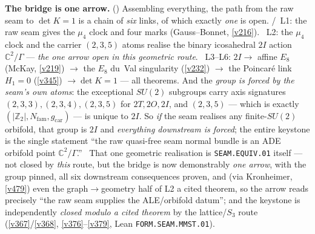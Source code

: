 \documentclass[11pt,a4paper]{article}
\newcommand{\gcar}{g_{\mathrm{car}}}
\newcommand{\Nfam}{N_{\mathrm{fam}}}
\newcommand{\Z}{\mathbb Z}
\begin{document}
\par\smallskip\noindent\textbf{The bridge is one arrow.} ()
Assembling everything, the path from the raw seam to $\det K{=}1$ is a chain of \emph{six} links, of which exactly
\emph{one} is open. \mE/\mC\ L1: the raw seam gives the $\mu_4$ clock and four marks (Gauss--Bonnet, \vref{v216}).
\mO\ L2: the $\mu_4$ clock and the carrier $(2,3,5)$ atoms realise the binary icosahedral $2I$ action
$\mathbb{C}^2/\Gamma$ --- \emph{the one arrow open in this geometric route}. \mE\ L3--L6: $2I\to$ affine $E_8$ (McKay, \vref{v219}) $\to$ the $E_8$ du~Val
singularity (\vref{v232}) $\to$ the Poincar\'e link $H_1{=}0$ (\vref{v345}) $\to\det K{=}1$ --- all theorems. And the
\emph{group is forced by the seam's own atoms}: the exceptional $SU(2)$ subgroups carry axis signatures
$(2,3,3),(2,3,4),(2,3,5)$ for $2T,2O,2I$, and $(2,3,5)$ --- which is exactly
$(|\Z_2|,\Nfam,\gcar)$ --- is unique to $2I$. So \emph{if} the seam realises any finite-$SU(2)$ orbifold, that group
is $2I$ and \emph{everything downstream is forced}; the entire keystone is the single statement ``the raw
quasi-free seam normal bundle is an ADE orbifold point $\mathbb{C}^2/\Gamma$.'' \mO\ That one geometric realisation is
\texttt{SEAM.EQUIV.01} itself --- not closed by \emph{this} route, but the bridge is now demonstrably \emph{one arrow},
with the group pinned, all six downstream consequences proven, and (via Kronheimer,
\vref{v479}) even the graph$\to$geometry half of L2 a cited theorem, so the arrow reads precisely ``the raw seam
supplies the ALE/orbifold datum''; and the keystone is independently \emph{closed
modulo a cited theorem} by the lattice/$S_3$ route (\vref{v367}/\vref{v368}, \vref{v376}--\vref{v379}, Lean
\texttt{FORM.SEAM.MMST.01}).
\end{document}
